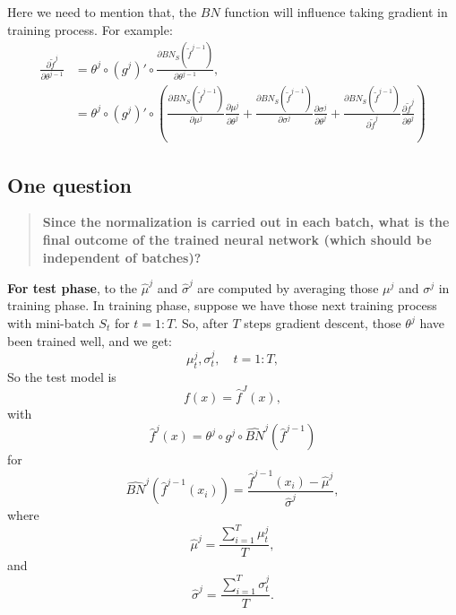 Here we need to mention that, the $BN$ function will influence taking gradient in training process. For example:
\begin{align}
\frac{\partial \tilde f^j}{ \partial \theta^{j-1}} &= \theta^j \circ (g^j)' \circ \frac{\partial BN_{S} (\tilde f^{j-1})}{ \partial \theta^{j-1}}, \\
&=  \theta^j \circ (g^j)' \circ (\frac{\partial BN_{S} (\tilde f^{j-1})}{ \partial \mu^j}\frac{\partial \mu^j}{\partial \theta^j} + \frac{\partial BN_{S} (\tilde f^{j-1})}{ \partial \sigma^j}\frac{\partial \sigma^j}{\partial \theta^j} + \frac{\partial BN_{S} (\tilde f^{j-1})}{ \partial \tilde f^j}\frac{\partial \tilde f^j}{\partial \theta^j}  )
\end{align}

\subsection{One question}
\begin{quote}
  \bf Since the normalization is carried out in each batch, what is
  the final outcome of the trained neural network (which should be
  independent of batches)?
\end{quote}
{\bf For test phase}, to the $\hat \mu^j$ and $\hat \sigma^j$ are computed
by averaging those $\mu^j$ and $\sigma^j$ in training phase. In training phase, suppose we have those next training process with mini-batch $S_t$ for $t = 1:T$. So, after $T$ steps gradient descent, those $\theta^j$ have been trained well, and we get:
\begin{equation}
\mu^j_{t}, \sigma^j_t, \quad t = 1:T,
\end{equation}
So the test model is
\begin{equation}
f(x) = \hat{f}^J(x),
\end{equation}
with
\begin{equation}
 \hat{f}^j(x) = \theta^j \circ g^j \circ \hat{BN}^j(\hat f^{j-1})
\end{equation}
for
\begin{equation}
\hat{BN}^j( \hat f^{j-1}(x_i) )= \frac{\hat f^{j-1}(x_i) - \hat \mu^j}{\hat \sigma^j},
\end{equation}
where
\begin{equation}
\hat \mu^j =\frac{\sum_{i=1}^T \mu^j_t }{T},
\end{equation}
and
\begin{equation}
\hat \sigma^j  = \frac{\sum_{i=1}^T \sigma^j_t }{T}.
\end{equation}

